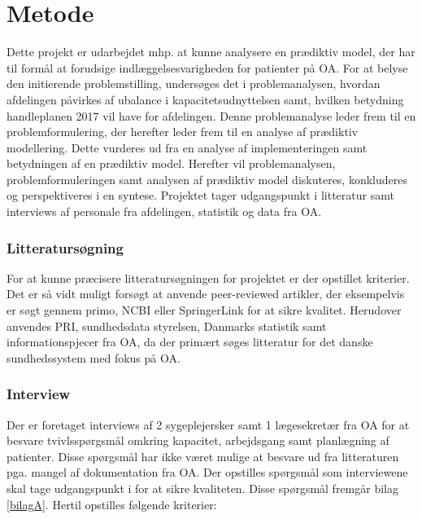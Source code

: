 \chapter{Metode}
Dette projekt er udarbejdet mhp. at kunne analysere en prædiktiv model, der har til formål at forudsige indlæggelsesvarigheden for patienter på OA. For at belyse den initierende problemstilling, undersøges det i problemanalysen, hvordan afdelingen påvirkes af ubalance i kapacitetsudnyttelsen samt, hvilken betydning handleplanen 2017 vil have for afdelingen. Denne problemanalyse leder frem til en problemformulering, der herefter leder frem til en analyse af prædiktiv modellering. Dette vurderes ud fra en analyse af implementeringen samt betydningen af en prædiktiv model. Herefter vil problemanalysen, problemformuleringen samt analysen af prædiktiv model diskuteres, konkluderes og perspektiveres i en syntese. Projektet tager udgangspunkt i litteratur samt interviews af personale fra afdelingen, statistik og data fra OA. 


\subsection{Litteratursøgning}
For at kunne præcisere litteratursøgningen for projektet er der opstillet kriterier. Det er så vidt muligt forsøgt at anvende peer-reviewed artikler, der eksempelvis er søgt gennem primo, NCBI eller SpringerLink for at sikre kvalitet. Herudover anvendes PRI, sundhedsdata styrelsen, Danmarks statistik samt informationspjecer fra OA, da der primært søges litteratur for det danske sundhedssystem med fokus på OA. 


\subsection{Interview}
Der er foretaget interviews af 2 sygeplejersker samt 1 lægesekretær fra OA for at besvare tvivlsspørgsmål omkring kapacitet, arbejdsgang samt planlægning af patienter. Disse spørgsmål har ikke været mulige at besvare ud fra litteraturen pga. mangel af dokumentation fra OA. Der opstilles spørgsmål som interviewene skal tage udgangspunkt i for at sikre kvaliteten. Disse spørgsmål fremgår bilag \ref{bilagA}. Hertil opstilles følgende kriterier: 


